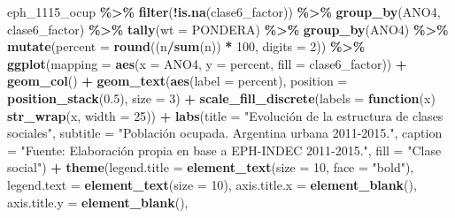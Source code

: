 \documentclass[
]{article}
\newenvironment{Shaded}{\begin{snugshade}}{\end{snugshade}}
\newcommand{\AttributeTok}[1]{\textcolor[rgb]{0.13,0.29,0.53}{#1}}
\newcommand{\ControlFlowTok}[1]{\textcolor[rgb]{0.13,0.29,0.53}{\textbf{#1}}}
\newcommand{\DecValTok}[1]{\textcolor[rgb]{0.00,0.00,0.81}{#1}}
\newcommand{\FloatTok}[1]{\textcolor[rgb]{0.00,0.00,0.81}{#1}}
\newcommand{\FunctionTok}[1]{\textcolor[rgb]{0.13,0.29,0.53}{\textbf{#1}}}
\newcommand{\NormalTok}[1]{#1}
\newcommand{\SpecialCharTok}[1]{\textcolor[rgb]{0.81,0.36,0.00}{\textbf{#1}}}
\newcommand{\StringTok}[1]{\textcolor[rgb]{0.31,0.60,0.02}{#1}}
\begin{document}
\begin{Shaded}
\begin{Highlighting}[]
\NormalTok{eph\_1115\_ocup }\SpecialCharTok{\%\textgreater{}\%}
    \FunctionTok{filter}\NormalTok{(}\SpecialCharTok{!}\FunctionTok{is.na}\NormalTok{(clase6\_factor)) }\SpecialCharTok{\%\textgreater{}\%}
    \FunctionTok{group\_by}\NormalTok{(ANO4, clase6\_factor) }\SpecialCharTok{\%\textgreater{}\%}
    \FunctionTok{tally}\NormalTok{(}\AttributeTok{wt =}\NormalTok{ PONDERA) }\SpecialCharTok{\%\textgreater{}\%}
    \FunctionTok{group\_by}\NormalTok{(ANO4) }\SpecialCharTok{\%\textgreater{}\%}
    \FunctionTok{mutate}\NormalTok{(}\AttributeTok{percent =} \FunctionTok{round}\NormalTok{((n}\SpecialCharTok{/}\FunctionTok{sum}\NormalTok{(n)) }\SpecialCharTok{*} \DecValTok{100}\NormalTok{, }\AttributeTok{digits =} \DecValTok{2}\NormalTok{)) }\SpecialCharTok{\%\textgreater{}\%}
    \FunctionTok{ggplot}\NormalTok{(}\AttributeTok{mapping =} \FunctionTok{aes}\NormalTok{(}\AttributeTok{x =}\NormalTok{ ANO4, }\AttributeTok{y =}\NormalTok{ percent, }\AttributeTok{fill =}\NormalTok{ clase6\_factor)) }\SpecialCharTok{+} \FunctionTok{geom\_col}\NormalTok{() }\SpecialCharTok{+}
    \FunctionTok{geom\_text}\NormalTok{(}\FunctionTok{aes}\NormalTok{(}\AttributeTok{label =}\NormalTok{ percent), }\AttributeTok{position =} \FunctionTok{position\_stack}\NormalTok{(}\FloatTok{0.5}\NormalTok{), }\AttributeTok{size =} \DecValTok{3}\NormalTok{) }\SpecialCharTok{+} \FunctionTok{scale\_fill\_discrete}\NormalTok{(}\AttributeTok{labels =} \ControlFlowTok{function}\NormalTok{(x) }\FunctionTok{str\_wrap}\NormalTok{(x,}
    \AttributeTok{width =} \DecValTok{25}\NormalTok{)) }\SpecialCharTok{+} \FunctionTok{labs}\NormalTok{(}\AttributeTok{title =} \StringTok{"Evolución de la estructura de clases sociales"}\NormalTok{,}
    \AttributeTok{subtitle =} \StringTok{"Población ocupada. Argentina urbana 2011{-}2015."}\NormalTok{, }\AttributeTok{caption =} \StringTok{"Fuente: Elaboración propia en base a EPH{-}INDEC 2011{-}2015."}\NormalTok{,}
    \AttributeTok{fill =} \StringTok{"Clase social"}\NormalTok{) }\SpecialCharTok{+} \FunctionTok{theme}\NormalTok{(}\AttributeTok{legend.title =} \FunctionTok{element\_text}\NormalTok{(}\AttributeTok{size =} \DecValTok{10}\NormalTok{, }\AttributeTok{face =} \StringTok{"bold"}\NormalTok{),}
    \AttributeTok{legend.text =} \FunctionTok{element\_text}\NormalTok{(}\AttributeTok{size =} \DecValTok{10}\NormalTok{), }\AttributeTok{axis.title.x =} \FunctionTok{element\_blank}\NormalTok{(), }\AttributeTok{axis.title.y =} \FunctionTok{element\_blank}\NormalTok{(),}

\end{Highlighting}
\end{Shaded}
\end{document}
